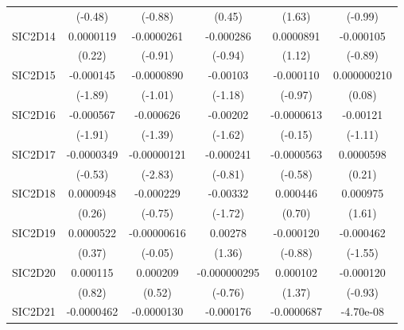 \begin{table}[htbp]
\begin{tabular}{l*{5}{c}}
            &     (-0.48)         &     (-0.88)         &      (0.45)         &      (1.63)         &     (-0.99)         \\
SIC2D14     &   0.0000119         &  -0.0000261         &   -0.000286         &   0.0000891         &   -0.000105         \\
            &      (0.22)         &     (-0.91)         &     (-0.94)         &      (1.12)         &     (-0.89)         \\
SIC2D15     &   -0.000145         &  -0.0000890         &    -0.00103         &   -0.000110         & 0.000000210         \\
            &     (-1.89)         &     (-1.01)         &     (-1.18)         &     (-0.97)         &      (0.08)         \\
SIC2D16     &   -0.000567         &   -0.000626         &    -0.00202         &  -0.0000613         &    -0.00121         \\
            &     (-1.91)         &     (-1.39)         &     (-1.62)         &     (-0.15)         &     (-1.11)         \\
SIC2D17     &  -0.0000349         & -0.00000121\sym{**} &   -0.000241         &  -0.0000563         &   0.0000598         \\
            &     (-0.53)         &     (-2.83)         &     (-0.81)         &     (-0.58)         &      (0.21)         \\
SIC2D18     &   0.0000948         &   -0.000229         &    -0.00332         &    0.000446         &    0.000975         \\
            &      (0.26)         &     (-0.75)         &     (-1.72)         &      (0.70)         &      (1.61)         \\
SIC2D19     &   0.0000522         & -0.00000616         &     0.00278         &   -0.000120         &   -0.000462         \\
            &      (0.37)         &     (-0.05)         &      (1.36)         &     (-0.88)         &     (-1.55)         \\
SIC2D20     &    0.000115         &    0.000209         &-0.000000295         &    0.000102         &   -0.000120         \\
            &      (0.82)         &      (0.52)         &     (-0.76)         &      (1.37)         &     (-0.93)         \\
SIC2D21     &  -0.0000462         &  -0.0000130         &   -0.000176         &  -0.0000687         &   -4.70e-08         \\

\end{tabular}
\end{table}
